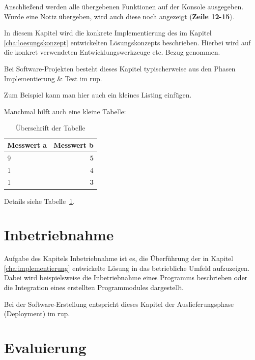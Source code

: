\documentclass[oneside]{ausarbeitung}
\begin{document}
Anschließend werden alle übergebenen Funktionen auf der Konsole ausgegeben. Wurde eine Notiz übergeben, wird auch diese noch angezeigt (\textbf{Zeile 12-15}). 



In diesem Kapitel wird die konkrete Implementierung des im Kapitel
\ref{cha:loesungskonzept} entwickelten Lösungskonzepts beschrieben.
Hierbei wird auf die konkret verwendeten Entwicklungswerkzeuge etc. 
Bezug genommen.

Bei Software-Projekten besteht dieses Kapitel typischerweise aus den 
Phasen Implementierung \& Test im \ac{rup}.

Zum Beispiel kann man hier auch ein kleines Listing einfügen.

Manchmal hilft auch eine kleine Tabelle:

\begin{table}[htbp]
\centering
\begin{tabular}{|l|r|}
\hline
\textbf{Messwert a} & \textbf{Messwert b} \\ \hline
9 & 5 \\ \hline
1 & 4 \\ \hline
1 & 3 \\ \hline
\end{tabular}
\caption{Überschrift der Tabelle}
\label{tab:my-table}
\end{table}

Details siehe Tabelle~\ref{tab:my-table}.

\chapter{Inbetriebnahme}
\label{cha:inbetriebnahme}

Aufgabe des Kapitels Inbetriebnahme ist es, die Überführung der in 
Kapitel \ref{cha:implementierung} entwickelte Lösung in das betriebliche 
Umfeld aufzuzeigen. Dabei wird beispielsweise die Inbetriebnahme eines 
Programms beschrieben oder die Integration eines erstellten 
Programmodules dargestellt.

Bei der Software-Erstellung entspricht dieses Kapitel der 
Auslieferungsphase (Deployment) im \ac{rup}.

\chapter{Evaluierung}
\end{document}

